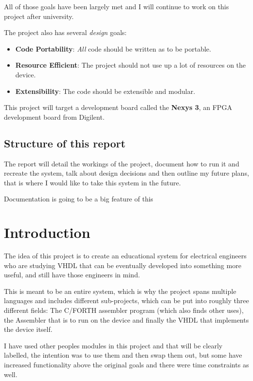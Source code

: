 \documentclass	[a4paper, 10pt]	{article}
\begin{document}
    All of those goals have been largely met and I will continue to work on this project after
    university.

    The project also has several \emph{design} goals:

    \begin{itemize}
      \item \textbf{Code Portability}: \emph{All} code should be written as to be portable.
      \item \textbf{Resource Efficient}: The project should not use up a lot of resources on the device.
      \item \textbf{Extensibility}: The code should be extensible and modular.
    \end{itemize}

    This project will target a development board called the \textbf{Nexys 3}, an FPGA development
    board from Digilent. 

    \subsection{Structure of this report}

    The report will detail the workings of the project, document how to run it and recreate the
    system, talk about design decisions and then outline my future plans, that is where I would
    like to take this system in the future.

    Documentation is going to be a big feature of this 

  \section{Introduction}

  The idea of this project is to create an educational system for electrical
  engineers who are studying VHDL that can be eventually developed into something 
  more useful, and still have those engineers in mind. 

  This is meant to be an entire system, which is why the project spans multiple
  languages and includes different sub-projects, which can be put into roughly
  three different fields: The C/FORTH assembler program (which also finds other
  uses), the Assembler that is to run on the device and finally the VHDL that implements
  the device itself.

  I have used other peoples modules in this project and that will be clearly labelled,
  the intention was to use them and then swap them out, but some have increased
  functionality above the original goals and there were time constraints as well.
\end{document}
